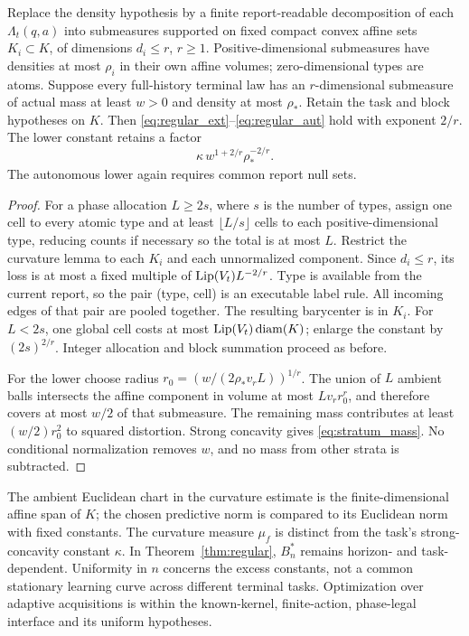 \begin{proposition}\label{prop:strata}
Replace the density hypothesis by a finite report-readable decomposition of each $\Lambda_t(q,a)$ into submeasures supported on fixed compact convex affine sets $K_i\subset K$, of dimensions $d_i\le r$, $r\ge1$. Positive-dimensional submeasures have densities at most $\rho_i$ in their own affine volumes; zero-dimensional types are atoms. Suppose every full-history terminal law has an $r$-dimensional submeasure of actual mass at least $w>0$ and density at most $\rho_*$. Retain the task and block hypotheses on $K$. Then \eqref{eq:regular_ext}--\eqref{eq:regular_aut} hold with exponent $2/r$. The lower constant retains a factor
\begin{equation}\label{eq:stratum_mass}
 \kappa\,w^{1+2/r}\rho_*^{-2/r}.
\end{equation}
The autonomous lower again requires common report null sets.
\end{proposition}
\begin{proof}
For a phase allocation $L\ge2s$, where $s$ is the number of types, assign one cell to every atomic type and at least $\lfloor L/s\rfloor$ cells to each positive-dimensional type, reducing counts if necessary so the total is at most $L$. Restrict the curvature lemma to each $K_i$ and each unnormalized component. Since $d_i\le r$, its loss is at most a fixed multiple of $\operatorname{Lip}(V_t)L^{-2/r}$. Type is available from the current report, so the pair (type, cell) is an executable label rule. All incoming edges of that pair are pooled together. The resulting barycenter is in $K_i$. For $L<2s$, one global cell costs at most $\operatorname{Lip}(V_t)\operatorname{diam}(K)$; enlarge the constant by $(2s)^{2/r}$. Integer allocation and block summation proceed as before.

For the lower choose radius $r_0=(w/(2\rho_*v_r L))^{1/r}$. The union of $L$ ambient balls intersects the affine component in volume at most $Lv_r r_0^r$, and therefore covers at most $w/2$ of that submeasure. The remaining mass contributes at least $(w/2)r_0^2$ to squared distortion. Strong concavity gives \eqref{eq:stratum_mass}. No conditional normalization removes $w$, and no mass from other strata is subtracted.
\end{proof}

The ambient Euclidean chart in the curvature estimate is the finite-dimensional affine span of $K$; the chosen predictive norm is compared to its Euclidean norm with fixed constants. The curvature measure $\mu_f$ is distinct from the task's strong-concavity constant $\kappa$. In Theorem~\ref{thm:regular}, $B_n^*$ remains horizon- and task-dependent. Uniformity in $n$ concerns the excess constants, not a common stationary learning curve across different terminal tasks. Optimization over adaptive acquisitions is within the known-kernel, finite-action, phase-legal interface and its uniform hypotheses.
